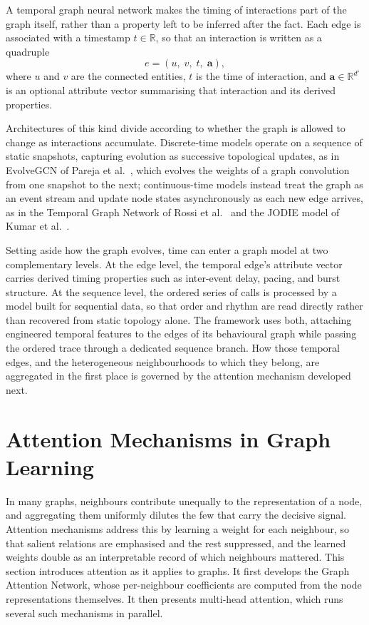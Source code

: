 \documentclass[%
    BCOR=10mm,
    DIV=13,
    toc=bibliography,
    toc=listof,
    oneside,
    12pt,
]{scrbook}
\begin{document}
A temporal graph neural network makes the timing of interactions part of the
graph itself, rather than a property left to be inferred after the fact. Each
edge is associated with a timestamp $t \in \mathbb{R}$, so that an interaction is
written as a quadruple
\begin{equation}
  e = (u,\; v,\; t,\; \mathbf{a}),
  \label{eq:temporal_edge}
\end{equation}
where $u$ and $v$ are the connected entities, $t$ is the time of interaction, and
$\mathbf{a} \in \mathbb{R}^{d'}$ is an optional attribute vector summarising that
interaction and its derived properties.

Architectures of this kind divide according to whether the graph is allowed to
change as interactions accumulate. Discrete-time models operate on a sequence
of static snapshots, capturing evolution as successive topological updates, as
in EvolveGCN of Pareja et al.~\cite{pareja2020evolvegcn}, which evolves the
weights of a graph convolution from one snapshot to the next; continuous-time
models instead treat the graph as an event stream and update node states
asynchronously as each new edge arrives, as in the Temporal Graph Network of
Rossi et al.~\cite{tgn2020} and the JODIE model of Kumar
et al.~\cite{kumar2019jodie}.

Setting aside how the graph evolves, time can enter a graph model at two
complementary levels. At the edge level, the temporal edge's attribute vector
carries derived timing properties such as inter-event delay, pacing, and burst
structure. At the sequence level, the ordered series of calls is processed by a
model built for sequential data, so that order and rhythm are read directly
rather than recovered from static topology alone. The framework uses both,
attaching engineered temporal features to the edges of its behavioural graph
while passing the ordered trace through a dedicated sequence branch. How those
temporal edges, and the heterogeneous neighbourhoods to which they belong, are
aggregated in the first place is governed by the attention mechanism developed
next.

\section{Attention Mechanisms in Graph Learning}
\label{sec:attention}

In many graphs, neighbours contribute unequally to the representation of a
node, and aggregating them uniformly dilutes the few that carry the decisive
signal. Attention mechanisms address this by learning a weight for each
neighbour, so that salient relations are emphasised and the rest suppressed,
and the learned weights double as an interpretable record of which neighbours
mattered. This section introduces attention as it applies to graphs. It first
develops the Graph Attention Network, whose per-neighbour coefficients are
computed from the node representations themselves. It then presents multi-head
attention, which runs several such mechanisms in parallel.
\end{document}
